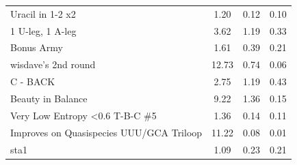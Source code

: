 \documentclass[letter]{bioinfo}
\begin{document}
\begin{center}
\begin{longtable}{l ccc}
Uracil in 1-2 x2				&1.20 	&0.12 	&0.10 \\
1 U-leg, 1 A-leg				&3.62 	&1.19 	&0.33 \\
Bonus Army					&1.61 	&0.39 	&0.21 \\
wisdave's 2nd round			&12.73 	&0.74 	&0.06 \\
C - BACK						&2.75	&1.19 	&0.43 \\
Beauty in Balance				&9.22 	&1.36 	&0.15 \\
Very Low Entropy <0.6 T-B-C \#5	&1.36 	&0.14 	&0.11 \\
Improves on Quasispecies UUU/GCA Triloop	&11.22 	&0.08 	&0.01 \\
sta1							&1.09 	&0.23 	&0.21 \\

\end{longtable}
\end{center}





\newpage


\end{document}
